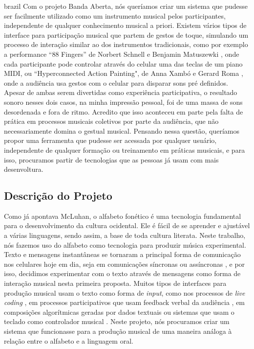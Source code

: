 \begin{otherlanguage*}{brazil}
Com o projeto Banda Aberta, nós queríamos criar um sistema que pudesse ser facilmente utilizado como um instrumento musical pelos participantes, independente de qualquer conhecimento musical a priori. Existem vários tipos de interface para participação musical que partem de gestos de toque, simulando um processo de interação similar ao dos instrumentos tradicionais, como por exemplo a performance ``88 Fingers'' de Norbert Schnell e Benjamin Matuszewki \cite{Schnell2017}, onde cada participante pode controlar através do celular uma das teclas de um piano MIDI, ou ``Hyperconnected Action Painting", de Anna Xambó e Gerard Roma \cite{Xambo2017}, onde a audiência usa gestos com o celular para disparar sons pré definidos. Apesar de ambas serem divertidas como experiência participativa, o resultado sonoro nesses dois casos, na minha impressão pessoal, foi de uma massa de sons desordenada e fora de ritmo. Acredito que isso aconteceu em parte pela falta de prática em processos musicais coletivos por parte da audiência, que não necessariamente domina o gestual musical. Pensando nessa questão, queríamos propor uma ferramenta que pudesse ser acessada por qualquer usuário, independente de qualquer formação ou treinamento em práticas musicais, e para isso, procuramos partir de tecnologias que as pessoas já usam com mais desenvoltura.

\subsection{Descrição do Projeto}
Como já apontava McLuhan\cite{mcluhan1968comunicaccoes}, o alfabeto fonético é uma tecnologia fundamental para o desenvolvimento da cultura ocidental. Ele é fácil de se aprender e ajustável a várias linguagens, sendo assim, a base de toda cultura literata. Neste trabalho, nós fazemos uso do alfabeto como tecnologia para produzir música experimental. Texto e mensagens instantâneas se tornaram a principal forma de comunicação nos celulares hoje em dia, seja em comunicações síncronas ou assíncronas \cite{Madell:2007}, e por isso, decidimos experimentar com  o texto através de mensagens como forma de interação musical nesta primeira proposta. Muitos tipos de interfaces para produção musical usam o texto como forma de \emph{input}, como nos processos de \emph{live coding} \cite{Collins2003}, em processos participativos que usam feedback verbal da audiência \cite{noauthor_transglasphone_nodate}, em composições algorítmicas geradas por dados textuais ou sistemas que usam o teclado como controlador musical \cite{Fiebrink2007}. Neste projeto, nós procuramos criar um sistema que funcionasse para a produção musical de uma maneira análoga à relação entre o alfabeto e a linguagem oral.


\end{otherlanguage*}
